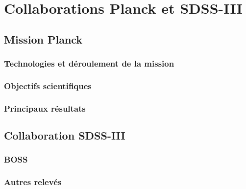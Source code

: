 
\chapter{Collaborations Planck et SDSS-III} %

\label{Chapter5} %


\section{Mission Planck}
\subsection{Technologies et déroulement de la mission}
\subsection{Objectifs scientifiques}
\subsection{Principaux résultats}

\section{Collaboration SDSS-III}
\subsection{BOSS}
\subsection{Autres relevés}
